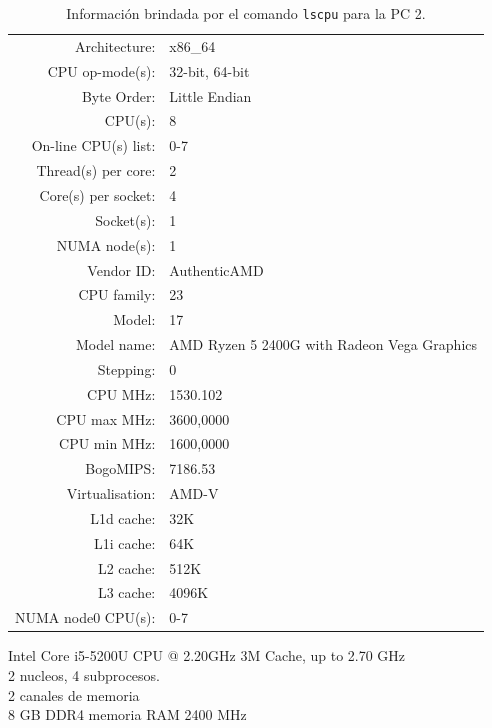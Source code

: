 \documentclass{article}
\begin{document}
\begin{description}[align=right]
        \begin{table}[H]
            \centering
            \begin{tabular} { r l }
                Architecture: &   	x86\_64\\
                CPU op-mode(s):  &	32-bit, 64-bit\\
                Byte Order:      	&Little Endian\\
                CPU(s):         & 	8\\
                On-line CPU(s) list: &0-7\\
                Thread(s) per core:  &2\\
                Core(s) per socket:  &4\\
                Socket(s):       	&1\\
                NUMA node(s): &   	1\\
                Vendor ID:    &   	AuthenticAMD\\
                CPU family:   &   	23\\
                Model:        &   	17\\
                Model name:   &   	AMD Ryzen 5 2400G with Radeon Vega Graphics\\
                Stepping:     &   	0\\
                CPU MHz:      &   	1530.102\\
                CPU max MHz:  &   	3600,0000\\
                CPU min MHz:  &   	1600,0000\\
                BogoMIPS:     &   	7186.53\\
                Virtualisation: & 	AMD-V\\
                L1d cache:      & 	32K\\
                L1i cache:      & 	64K\\
                L2 cache:       & 	512K\\
                L3 cache:       & 	4096K\\
                NUMA node0 CPU(s): &  0-7\\
            \end{tabular}
            \caption{Información brindada por el comando \texttt{lscpu} para la PC 2.}
        \end{table}
    \item [PC3] Intel Core i5-5200U CPU @ 2.20GHz 3M Cache, up to 2.70 GHz\\
        2 nucleos, 4 subprocesos.\\
        2 canales de memoria\\
        8 GB DDR4 memoria RAM 2400 MHz


\end{description}
\end{document}
